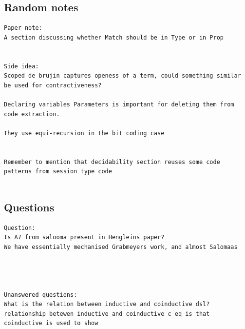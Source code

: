 \subsection{Random notes}
\begin{verbatim}
Paper note:
A section discussing whether Match should be in Type or in Prop


Side idea:
Scoped de brujin captures openess of a term, could something similar be used for contractiveness?

Declaring variables Parameters is important for deleting them from code extraction.

They use equi-recursion in the bit coding case


Remember to mention that decidability section reuses some code patterns from session type code


\end{verbatim}



\subsection{Questions}
\begin{verbatim}
Question:
Is A7 from salooma present in Hengleins paper?
We have essentially mechanised Grabmeyers work, and almost Salomaas 




Unanswered questions:
What is the relation between inductive and coinductive dsl? 
relationship betewen inductive and coinductive c_eq is that coinductive is used to show 




\end{verbatim}




